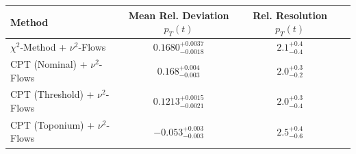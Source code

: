     \begin{tabular}{lccc}
        \toprule
        Method & Mean Rel. Deviation $p_{T}(t)$ & Rel. Resolution $p_{T}(t)$ \\
        \midrule
        $\chi^2$-Method + $\nu^2$-Flows & $0.1680^{+0.0037}_{-0.0018}$ & $2.1^{+0.4}_{-0.4}$ \\
        CPT (Nominal) + $\nu^2$-Flows & $0.168^{+0.004}_{-0.003}$ & $2.0^{+0.3}_{-0.2}$ \\
        CPT (Threshold) + $\nu^2$-Flows & $0.1213^{+0.0015}_{-0.0021}$ & $2.0^{+0.3}_{-0.4}$ \\
        CPT (Toponium) + $\nu^2$-Flows & $-0.053^{+0.003}_{-0.003}$ & $2.5^{+0.4}_{-0.6}$ \\
        \bottomrule
    \end{tabular}